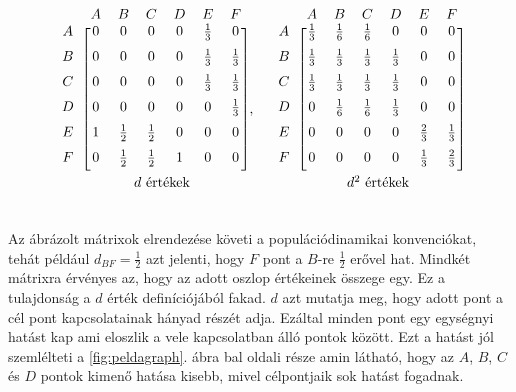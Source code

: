 \documentclass[a4paper,12pt]{article}
\begin{document}
	\[
	\begin{blockarray}{ccccccc}
	&A & B & C & D & E & F \\
	\begin{block}{c [cccccc]}
	A &0 & 0 & 0 & 0 & \frac{1}{3} & 0 \\[6pt] 
	B & 0 & 0 & 0 & 0 & \frac{1}{3} & \frac{1}{3}\\[6pt] 
	C & 0 & 0 & 0 & 0 & \frac{1}{3} & \frac{1}{3}\\[6pt] 
	D & 0 & 0 & 0 & 0 & 0 & \frac{1}{3}\\[6pt] 
	E & 1 & \frac{1}{2} & \frac{1}{2} & 0 & 0 & 0\\ [6pt] 
	F & 0 & \frac{1}{2} & \frac{1}{2} & 1 & 0 & 0\\ [6pt]
	\end{block}
	\multicolumn{7}{c}{\indent $d$ értékek} \\ [6pt]
	\end{blockarray},\quad
	\begin{blockarray}{ccccccc}
	&A & B & C & D & E & F \\ 
	\begin{block}{c [cccccc]}
	A & \frac{1}{3} & \frac{1}{6} & \frac{1}{6} & 0 & 0 & 0 \\[6pt] 
	B & \frac{1}{3} & \frac{1}{3} & \frac{1}{3} & \frac{1}{3} & 0 & 0\\ [6pt] 
	C & \frac{1}{3} & \frac{1}{3} & \frac{1}{3} & \frac{1}{3} & 0 & 0\\[6pt] 
	D & 0 & \frac{1}{6} & \frac{1}{6} & \frac{1}{3} & 0 & 0\\[6pt] 
	E & 0 & 0 & 0 & 0 & \frac{2}{3} & \frac{1}{3}\\ [6pt] 
	F & 0 & 0 & 0 & 0 & \frac{1}{3} & \frac{2}{3}\\ [6pt]
	\end{block}
	\multicolumn{7}{c}{\indent $d^2$ értékek} \\[6pt]
	\end{blockarray}
	\]
	
	Az ábrázolt mátrixok elrendezése követi a populációdinamikai konvenciókat, tehát például $d_{BF}=\frac{1}{2}$ azt jelenti, hogy $F$ pont a $B$-re $\frac{1}{2}$ erővel hat. Mindkét mátrixra érvényes az, hogy az adott oszlop értékeinek összege egy. Ez a tulajdonság a $d$ érték definíciójából fakad. $d$ azt mutatja meg, hogy adott pont a cél pont kapcsolatainak hányad részét adja. Ezáltal minden pont egy egységnyi hatást kap ami eloszlik a vele kapcsolatban álló pontok között. \cite{ti} Ezt a hatást jól szemlélteti a \ref{fig:peldagraph}. ábra bal oldali része amin látható, hogy az $A$, $B$, $C$ és $D$ pontok kimenő hatása kisebb, mivel célpontjaik sok hatást fogadnak.
	
\end{document}

